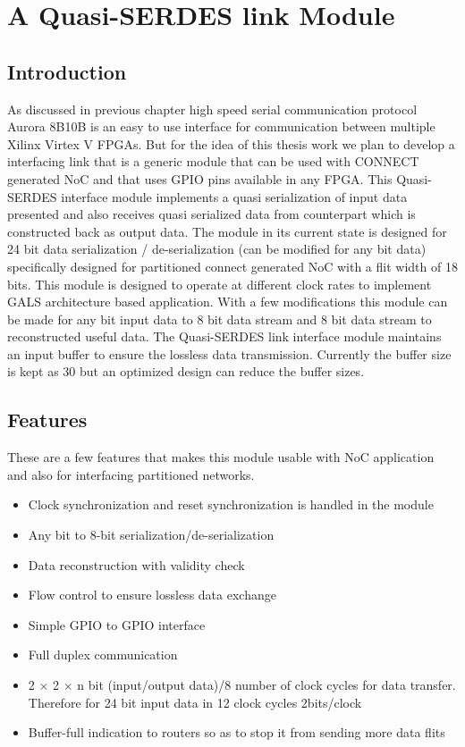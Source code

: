 \chapter{A Quasi-SERDES link Module} 
\label{chapter5}
\section {Introduction}
As discussed in previous chapter high speed serial communication protocol Aurora 8B10B is an easy to use interface for communication between multiple Xilinx Virtex V FPGAs. But for the idea of this thesis work we plan to develop a interfacing link that is a generic module that can be used with CONNECT generated NoC and that uses GPIO pins available in any FPGA. This Quasi-SERDES interface module implements a quasi serialization of input data presented and also receives quasi serialized data from counterpart which is constructed back as output data. The module in its current state is designed for 24 bit data serialization / de-serialization (can be modified for any bit data) specifically designed for partitioned connect generated NoC with a flit width of 18 bits. This module is designed to operate at different clock rates to implement GALS architecture based application. With a few modifications this module can be made for any bit input data to 8 bit data stream and 8 bit data stream to reconstructed useful data. The Quasi-SERDES link interface module maintains an input buffer to ensure the lossless data transmission. Currently the buffer size is kept as 30 but an optimized design can reduce the buffer sizes.\\

\section{Features}
These are a few features that makes this module usable with NoC application and also for interfacing partitioned networks.
\begin{itemize} 
	\item{Clock synchronization and reset synchronization is handled in the module}
	\item{Any bit to 8-bit serialization/de-serialization}
	\item{Data reconstruction with validity check}
	\item{Flow control to ensure lossless data exchange}
	\item{Simple GPIO to GPIO interface}
	\item{Full duplex communication}
	\item{2 $\times$ 2 $\times$ n bit (input/output data)/8 number of clock cycles for data transfer. Therefore for 24 bit input data in 12 clock cycles 2bits/clock}
	\item{Buffer-full indication to routers so as to stop it from sending more data flits}
\end{itemize}

